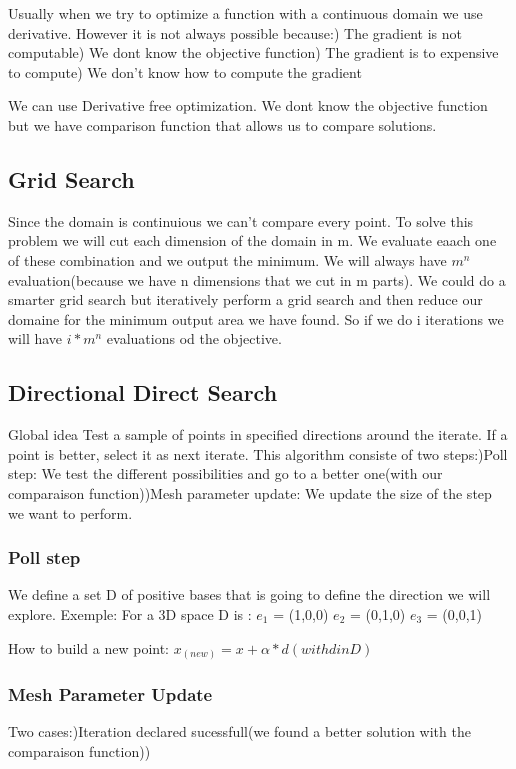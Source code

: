 Usually when we try to optimize a function with a continuous domain we use derivative.
However it is not always possible because:) The gradient is not computable) We dont know the objective function) The gradient is to expensive to compute) We don't know how to compute the gradient\newline

We can use Derivative free optimization.
We dont know the objective function but we have comparison function that allows us to compare solutions.

\subsection{Grid Search}
Since the domain is continuious we can't compare every point. To solve this problem we will cut each dimension of the domain in m. We evaluate eaach one of these combination and we output the minimum.
We will always have $m^n$ evaluation(because we have n dimensions that we cut in m parts).
We could do a smarter grid search but iteratively perform a grid search and then reduce our domaine for the minimum output area we have found.
So if we do i iterations we will have $i * m^n$ evaluations od the objective.
\subsection{Directional Direct Search}
Global idea\newline
Test a sample of points in specified directions around the iterate.
If a point is better, select it as next iterate.\newline
This algorithm consiste of two steps:)Poll step:\newline
We test the different possibilities and go to a better one(with our comparaison function))Mesh parameter update:\newline
We update the size of the step we want to perform.\newline
\subsubsection{Poll step}
We define a set D of positive bases that is going to define the direction we will explore.
Exemple:\newline
For a 3D space D is :\newline
$e_1$ = (1,0,0)\newline
$e_2$ = (0,1,0)\newline
$e_3$ = (0,0,1)\newline

How to build a new point:\newline
$x_(new) = x+\alpha*d (with d in D)$
\subsubsection{Mesh Parameter Update}
Two cases:)Iteration declared sucessfull(we found a better solution with the comparaison function))



